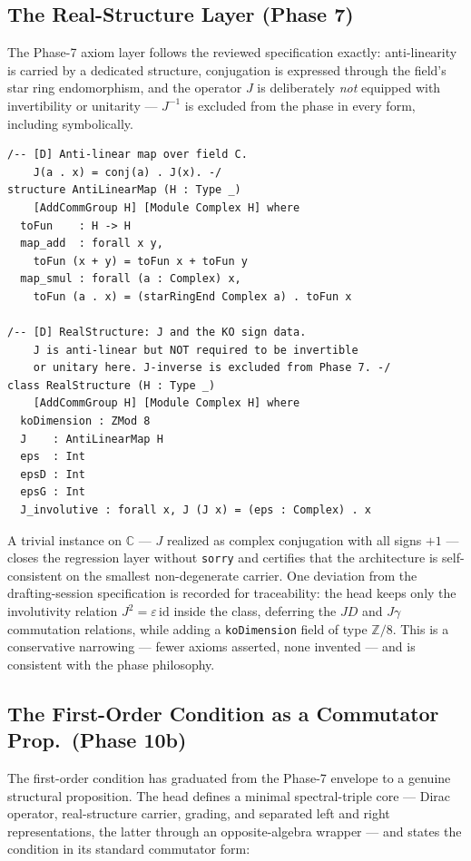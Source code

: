 \documentclass[12pt,a4paper,twoside]{article}
\theoremstyle{plain}
\theoremstyle{definition}
\theoremstyle{remark}
\begin{document}
\subsection{The Real-Structure Layer (Phase 7)}
\label{subsec:real-structure}

The Phase-7 axiom layer follows the reviewed specification exactly:
anti-linearity is carried by a dedicated structure, conjugation is
expressed through the field's star ring endomorphism, and the operator $J$
is deliberately \emph{not} equipped with invertibility or unitarity ---
$J^{-1}$ is excluded from the phase in every form, including symbolically.

\begin{lstlisting}
/-- [D] Anti-linear map over field C.
    J(a . x) = conj(a) . J(x). -/
structure AntiLinearMap (H : Type _)
    [AddCommGroup H] [Module Complex H] where
  toFun    : H -> H
  map_add  : forall x y,
    toFun (x + y) = toFun x + toFun y
  map_smul : forall (a : Complex) x,
    toFun (a . x) = (starRingEnd Complex a) . toFun x

/-- [D] RealStructure: J and the KO sign data.
    J is anti-linear but NOT required to be invertible
    or unitary here. J-inverse is excluded from Phase 7. -/
class RealStructure (H : Type _)
    [AddCommGroup H] [Module Complex H] where
  koDimension : ZMod 8
  J    : AntiLinearMap H
  eps  : Int
  epsD : Int
  epsG : Int
  J_involutive : forall x, J (J x) = (eps : Complex) . x
\end{lstlisting}

A trivial instance on $\mathbb C$ --- $J$ realized as complex conjugation
with all signs $+1$ --- closes the regression layer without \texttt{sorry}
and certifies that the architecture is self-consistent on the smallest
non-degenerate carrier. One deviation from the drafting-session
specification is recorded for traceability: the head keeps only the
involutivity relation $J^2 = \varepsilon\,\mathrm{id}$ inside the class,
deferring the $JD$ and $J\gamma$ commutation relations, while adding a
\texttt{koDimension} field of type $\mathbb Z/8$. This is a conservative
narrowing --- fewer axioms asserted, none invented --- and is consistent
with the phase philosophy.

\subsection{The First-Order Condition as a Commutator Prop.\ (Phase 10b)}
\label{subsec:foc}

The first-order condition has graduated from the Phase-7 envelope to a
genuine structural proposition. The head defines a minimal spectral-triple
core --- Dirac operator, real-structure carrier, grading, and separated
left and right representations, the latter through an opposite-algebra
wrapper --- and states the condition in its standard commutator form:
\end{document}
